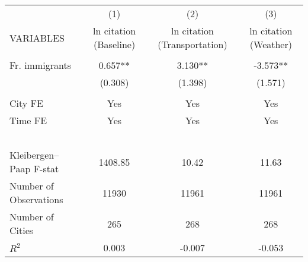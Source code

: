 \begin{tabular}{lccc} \hline
 & (1) & (2) & (3) \\
VARIABLES & ln citation (Baseline) & ln citation (Transportation) & ln citation (Weather) \\ \hline
 &  &  &  \\
Fr. immigrants & 0.657** & 3.130** & -3.573** \\
 & (0.308) & (1.398) & (1.571) \\
 &  &  &  \\
City FE & Yes & Yes & Yes \\
Time FE & Yes & Yes & Yes \\
~ & ~ & ~ & ~ \\
Kleibergen–Paap F-stat & 1408.85 & 10.42 & 11.63 \\
Number of Observations & 11930 & 11961 & 11961 \\
Number of Cities & 265 & 268 & 268 \\
 $ R^2$ & 0.003 & -0.007 & -0.053 \\ \hline
\end{tabular}

